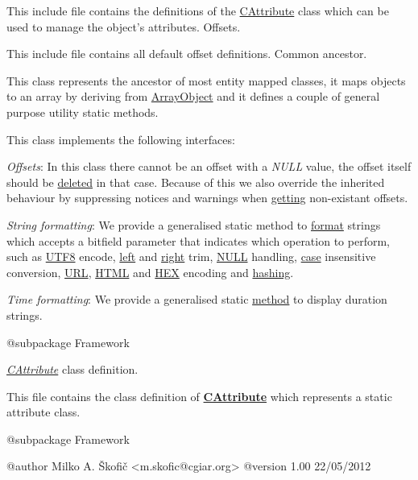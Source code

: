 This include file contains the definitions of the \hyperlink{class_c_attribute}{C\-Attribute} class which can be used to manage the object's attributes. Offsets.

This include file contains all default offset definitions. Common ancestor.

This class represents the ancestor of most entity mapped classes, it maps objects to an array by deriving from \hyperlink{}{Array\-Object} and it defines a couple of general purpose utility static methods.

This class implements the following interfaces\-:


\begin{DoxyItemize}
\item {\itshape Offsets}\-: In this class there cannot be an offset with a {\itshape N\-U\-L\-L} value, the offset itself should be \hyperlink{}{deleted} in that case. Because of this we also override the inherited behaviour by suppressing notices and warnings when \hyperlink{}{getting} non-\/existant offsets. 
\item {\itshape String formatting}\-: We provide a generalised static method to \hyperlink{}{format} strings which accepts a bitfield parameter that indicates which operation to perform, such as \hyperlink{}{U\-T\-F8} encode, \hyperlink{}{left} and \hyperlink{}{right} trim, \hyperlink{}{N\-U\-L\-L} handling, \hyperlink{}{case} insensitive conversion, \hyperlink{}{U\-R\-L}, \hyperlink{}{H\-T\-M\-L} and \hyperlink{}{H\-E\-X} encoding and \hyperlink{}{hashing}. 
\item {\itshape Time formatting}\-: We provide a generalised static \hyperlink{}{method} to display duration strings. 
\end{DoxyItemize}

\begin{DoxyVerb}    @subpackage     Framework\end{DoxyVerb}


{\itshape \hyperlink{class_c_attribute}{C\-Attribute}} class definition.

This file contains the class definition of {\bfseries \hyperlink{class_c_attribute}{C\-Attribute}} which represents a static attribute class.

\begin{DoxyVerb}    @subpackage     Framework

    @author         Milko A. Škofič <m.skofic@cgiar.org>
    @version        1.00 22/05/2012\end{DoxyVerb}


